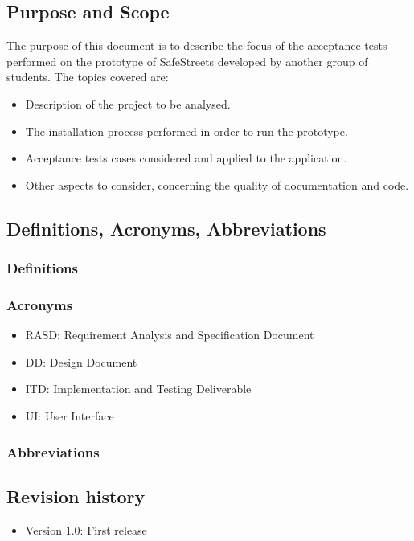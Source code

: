 \subsection{Purpose and Scope}

The purpose of this document is to describe the focus of the acceptance tests performed on the prototype of SafeStreets developed by another group of students.
The topics covered are:
\begin{itemize}
    \item 
    Description of the project to be analysed.
    \item 
    The installation process performed in order to run the prototype.
    \item
    Acceptance tests cases considered and applied to the application.
    \item
    Other aspects to consider, concerning the quality of documentation and code.
\end{itemize}

\subsection{Definitions, Acronyms, Abbreviations}
\subsubsection{Definitions}

\subsubsection{Acronyms}
\begin{itemize}
    \item
    RASD: Requirement Analysis and Specification Document
    \item
    DD: Design Document
    \item
    ITD: Implementation and Testing Deliverable
    \item
    UI: User Interface
\end{itemize}

\subsubsection{Abbreviations}


\subsection{Revision history}

\begin{itemize}
    \item Version 1.0: First release
\end{itemize}